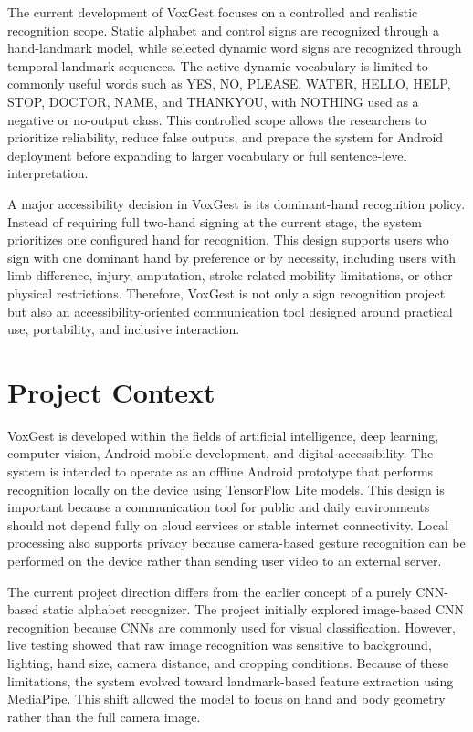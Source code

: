 The current development of VoxGest focuses on a controlled and realistic recognition scope. Static alphabet and control signs are recognized through a hand-landmark model, while selected dynamic word signs are recognized through temporal landmark sequences. The active dynamic vocabulary is limited to commonly useful words such as YES, NO, PLEASE, WATER, HELLO, HELP, STOP, DOCTOR, NAME, and THANKYOU, with NOTHING used as a negative or no-output class. This controlled scope allows the researchers to prioritize reliability, reduce false outputs, and prepare the system for Android deployment before expanding to larger vocabulary or full sentence-level interpretation.

A major accessibility decision in VoxGest is its dominant-hand recognition policy. Instead of requiring full two-hand signing at the current stage, the system prioritizes one configured hand for recognition. This design supports users who sign with one dominant hand by preference or by necessity, including users with limb difference, injury, amputation, stroke-related mobility limitations, or other physical restrictions. Therefore, VoxGest is not only a sign recognition project but also an accessibility-oriented communication tool designed around practical use, portability, and inclusive interaction.

\section{Project Context}

VoxGest is developed within the fields of artificial intelligence, deep learning, computer vision, Android mobile development, and digital accessibility. The system is intended to operate as an offline Android prototype that performs recognition locally on the device using TensorFlow Lite models. This design is important because a communication tool for public and daily environments should not depend fully on cloud services or stable internet connectivity. Local processing also supports privacy because camera-based gesture recognition can be performed on the device rather than sending user video to an external server.

The current project direction differs from the earlier concept of a purely CNN-based static alphabet recognizer. The project initially explored image-based CNN recognition because CNNs are commonly used for visual classification. However, live testing showed that raw image recognition was sensitive to background, lighting, hand size, camera distance, and cropping conditions. Because of these limitations, the system evolved toward landmark-based feature extraction using MediaPipe. This shift allowed the model to focus on hand and body geometry rather than the full camera image.

